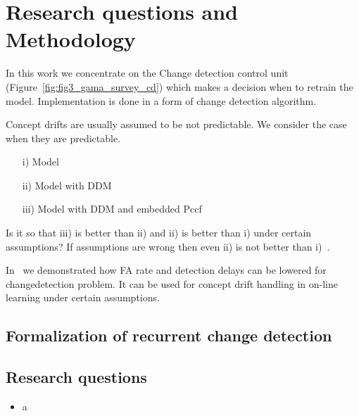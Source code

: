 \chapter{Research questions and Methodology}
In this work we concentrate on the Change detection control unit (Figure~\ref{fig:fig3_gama_survey_cd}) which makes a decision when to retrain the model.
Implementation is done in a form of change detection algorithm.

Concept drifts are usually assumed to be not predictable.
We consider the case when they are predictable.

\begin{itemize}
  \item [i)] Model
  \item [ii)] Model with DDM
  \item [iii)] Model with DDM and embedded Pccf
\end{itemize}

Is it so that iii) is better than ii) and ii) is better than i) under certain assumptions?
If assumptions are wrong then even ii) is not better than i)~\cite{SouzaRMB20}.

In~\cite{XXX} we demonstrated how FA rate and detection delays can be lowered for changedetection problem.
It can be used for concept drift handling in on-line learning under certain assumptions.


\section{Formalization of recurrent change detection}



\section{Research questions}
\begin{itemize}
    \item a
\end{itemize}

